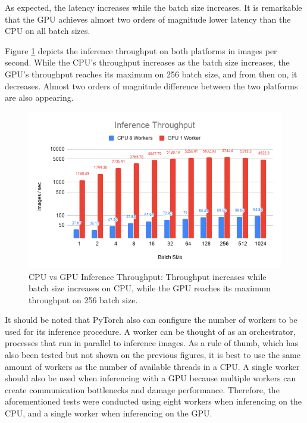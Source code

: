 As expected, the latency increases while the batch size increases. It is remarkable that the GPU achieves almost two orders of magnitude lower latency than the CPU on all batch sizes.

Figure \ref{fig:CPU-vs-GPU-Inference-Throughput} depicts the inference throughput on both platforms in images per second. While the CPU's throughput increases as the batch size increases, the GPU's throughput reaches its maximum on 256 batch size, and from then on, it decreases. Almost two orders of magnitude difference between the two platforms are also appearing.

\begin{figure} [H]
	\centering
	\includegraphics[width=\textwidth]{../Images/Results/CPU-GPU-Inference-Throughput.png}
	\decoRule
	\caption[CPU vs GPU Inference Throughput]{CPU vs GPU Inference Throughput: Throughput increases while batch size increases on CPU, while the GPU reaches its maximum throughput on 256 batch size.}
	\label{fig:CPU-vs-GPU-Inference-Throughput}
\end{figure}

It should be noted that PyTorch also can configure the number of workers to be used for its inference procedure. A worker can be thought of as an orchestrator, processes that run in parallel to inference images. As a rule of thumb, which has also been tested but not shown on the previous figures, it is best to use the same amount of workers as the number of available threads in a CPU. A single worker should also be used when inferencing with a GPU because multiple workers can create communication bottlenecks and damage performance. Therefore, the aforementioned tests were conducted using eight workers when inferencing on the CPU, and a single worker when inferencing on the GPU.

